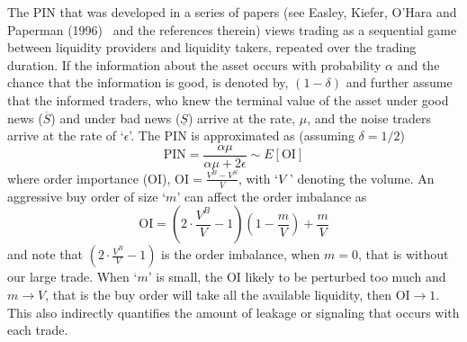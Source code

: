The PIN that was developed in a series of papers (see Easley, Kiefer, O'Hara and Paperman (1996)~\cite{paper} and the references therein) views trading as a sequential game between liquidity providers and liquidity takers, repeated over the trading duration. If the information about the asset occurs with probability $\alpha$ and the chance that the information is good, is denoted by, $(1-\delta)$ and further assume that the informed traders, who knew the terminal value of the asset under good news ($\overline{S}$) and under bad news ($\underline{S}$) arrive at the rate, $\mu$, and the noise traders arrive at the rate of `$\epsilon$'. The PIN is approximated as (assuming $\delta=1/2$)
	\begin{equation}\label{eqn:pin}
	\text{PIN}=\dfrac{\alpha\mu}{\alpha\mu+2\epsilon} \sim E[\text{OI}]
	\end{equation}
where order importance (OI), $\text{OI}=\frac{V^B-V^S}{V}$, with $`V$' denoting the volume. An aggressive buy order of size `$m$' can affect the order imbalance as
	\begin{equation}\label{eqn:oi}
	\text{OI}=\left(2 \cdot \dfrac{V^B}{V}-1\right)\left(1-\dfrac{m}{V}\right) + \dfrac{m}{V}
	\end{equation}
and note that $\left(2\cdot \frac{V^B}{V}-1\right)$ is the order imbalance, when $m=0$, that is without our large trade. When `$m$' is small, the OI likely to be perturbed too much and $m \to V$, that is the buy order will take all the available liquidity, then OI$\to1$. This also indirectly quantifies the amount of leakage or signaling that occurs with each trade.


